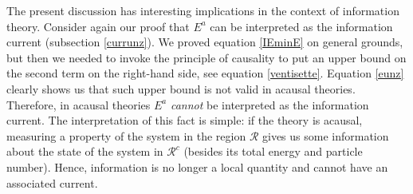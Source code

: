 \documentclass[aps,prl,reprint,nofootinbib]{revtex4-1}
\begin{document}
The present discussion has interesting implications in the context of information theory. Consider again our proof that $E^a$ can be interpreted as the information current (subsection \ref{currunz}). We proved equation \eqref{IEminE} on general grounds, but then we needed to invoke the principle of causality to put an upper bound on the second term on the right-hand side, see equation \eqref{ventisette}. Equation \eqref{eunz} clearly shows us that such upper bound is not valid in acausal theories. Therefore, in acausal theories $E^a$ \textit{cannot} be interpreted as the information current. The interpretation of this fact is simple: if the theory is acausal, measuring a property of the system in the region $\mathcal{R}$ gives us some information about the state of the system in $\mathcal{R}^c$ (besides its total energy and particle number). Hence, information is no longer a local quantity and cannot have an associated current.
\end{document}
